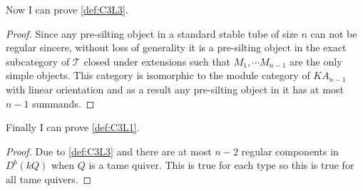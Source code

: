 \indent Now I can prove \ref{def:C3L3}.
\begin{proof}
\indent Since any pre-silting object in a standard stable tube of size $n$ can not be regular sincere, without loss of generality it is a pre-silting object in the exact subcategory of $\mathcal{T}$ closed under extensions such that $M_1,\cdots M_{n-1}$ are the only simple objects. This category is isomorphic to the module category of $KA_{n-1}$ with linear orientation and as a result any pre-silting object in it has at most $n-1$ summands. 
\end{proof}
\indent Finally I can prove \ref{def:C3L1}.
\begin{proof}
\indent Due to \ref{def:C3L3} and \cite{DR76} there are at most $n-2$ regular components in $D^b(kQ)$ when $Q$ is a tame quiver. This is true for each type so this is true for all tame quivers.
\end{proof}
